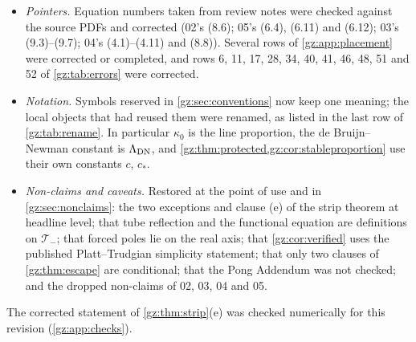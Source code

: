 \documentclass[11pt,a4paper]{article}
\numberwithin{equation}{section}
\theoremstyle{definition}
\theoremstyle{remark}
\newcommand{\Tm}{\mathcal T_{-}}
\begin{document}
\begin{itemize}
 Remark 7.4 anticipates the extension of its Theorem 7.3. The proof routes
 of the Stirling identities, the two parts of \cref{gz:thm:forced}, the
 values in \cref{gz:ex:canonical-gamma} not printed by 03, 05's gloss of
 $R_{1/2,0}$, the Montgomery--Taylor constant, and further credits to 02, 04
 and 06 are attributed correctly. The dates, authorship and reading lists of
 the sources are stated as they are. A dropped second route is disclosed.
 References to internal review notes, an unused phantom label, a quotation
 that no source wrote and two paraphrases printed as quotations were
 removed or replaced by verbatim quotations. Two collection labels were
 corrected (; the holomorphic scope of
 ).
\item \emph{Pointers.} Equation numbers taken from review notes were checked
 against the source PDFs and corrected (02's (8.6); 05's (6.4), (6.11) and
 (6.12); 03's (9.3)--(9.7); 04's (4.1)--(4.11) and (8.8)). Several rows of
 \cref{gz:app:placement} were corrected or completed, and rows 6, 11, 17, 28,
 34, 40, 41, 46, 48, 51 and 52 of \cref{gz:tab:errors} were corrected.
\item \emph{Notation.} Symbols reserved in \cref{gz:sec:conventions} now keep
 one meaning; the local objects that had reused them were renamed, as
 listed in the last row of \cref{gz:tab:rename}. In particular $\kappa_0$
 is the line proportion, the de Bruijn--Newman constant is
 $\Lambda_{\rm DN}$, and \cref{gz:thm:protected,gz:cor:stableproportion}
 use their own constants $c$, $c_*$.
\item \emph{Non-claims and caveats.} Restored at the point of use and in
 \cref{gz:sec:nonclaims}: the two exceptions and clause (e) of the strip
 theorem at headline level; that tube reflection and the functional equation
 are definitions on $\Tm$; that forced poles lie on the real axis; that
 \cref{gz:cor:verified} uses the published Platt--Trudgian simplicity
 statement; that only two clauses of \cref{gz:thm:escape} are conditional;
 that the Pong Addendum was not checked; and the dropped non-claims of 02,
 03, 04 and 05.
\end{itemize}
The corrected statement of \cref{gz:thm:strip}(e) was checked numerically for
this revision (\cref{gz:app:checks}).
\end{document}
